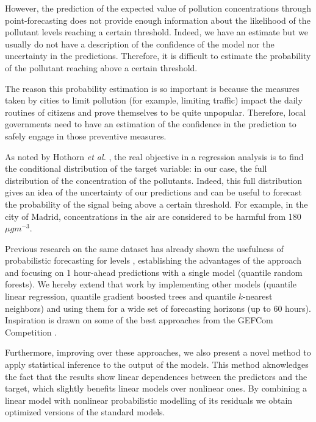 \documentclass[a4paper,3p,sort&compress]{elsarticle}
\begin{document}
However, the prediction of the expected value of pollution
concentrations through point-forecasting does not provide enough
information about the likelihood of the pollutant levels reaching a
certain threshold. Indeed, we have an estimate but we usually do not
have a description of the confidence of the model nor the uncertainty
in the predictions. Therefore, it is difficult to estimate the
probability of the pollutant reaching above a certain threshold.

The reason this probability estimation is so important is because the
measures taken by cities to limit pollution (for example, limiting
traffic) impact the daily routines of citizens and prove themselves to
be quite unpopular.  Therefore, local governments need to have an
estimation of the confidence in the prediction to safely engage in
those preventive measures.


As noted by Hothorn \emph{et al.} \cite{hothorn_conditional_2014}, the
real objective in a regression analysis is to find the conditional
distribution of the target variable: in our case, the full
distribution of the concentration of the pollutants. Indeed, this full
distribution gives an idea of the uncertainty of our predictions and
can be useful to forecast the probability of the signal being above a
certain threshold. For example, in the city of Madrid, \no
concentrations in the air are considered to be harmful from 180
$\mu g m^{-3}$.

Previous research on the same dataset has already shown the usefulness
of probabilistic forecasting for \no levels \cite{proba_aznarte},
establishing the advantages of the approach and focusing on 1
hour-ahead predictions with a single model (quantile random
forests). We hereby extend that work by implementing other models
(quantile linear regression, quantile gradient boosted trees %
and quantile $k$-nearest neighbors) and using them for
a wide set of forecasting horizons (up to 60 hours). Inspiration is
drawn on some of the best approaches from the GEFCom Competition
\cite{mangalova_k-nearest_2016,hong_probabilistic_2016}.

Furthermore, improving over these approaches, we also present a novel
method to apply statistical inference to the output of the
models. This method aknowledges the fact that the results show linear
dependences between the predictors and the target, which slightly
benefits linear models over nonlinear ones. By combining a linear
model with nonlinear probabilistic modelling of its residuals we
obtain optimized versions of the standard models.
\end{document}
